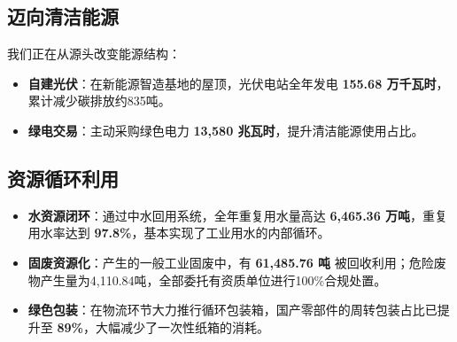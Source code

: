 \documentclass[a4paper,12pt]{article}
\begin{document}
\subsection{迈向清洁能源}
我们正在从源头改变能源结构：
\begin{itemize}
    \item \textbf{自建光伏}：在新能源智造基地的屋顶，光伏电站全年发电 \textbf{155.68 万千瓦时}，累计减少碳排放约835吨。
    \item \textbf{绿电交易}：主动采购绿色电力 \textbf{13,580 兆瓦时}，提升清洁能源使用占比。
\end{itemize}

\subsection{资源循环利用}
\begin{itemize}
    \item \textbf{水资源闭环}：通过中水回用系统，全年重复用水量高达 \textbf{6,465.36 万吨}，重复用水率达到 \textbf{97.8\%}，基本实现了工业用水的内部循环。
    \item \textbf{固废资源化}：产生的一般工业固废中，有 \textbf{61,485.76 吨} 被回收利用；危险废物产生量为4,110.84吨，全部委托有资质单位进行100\%合规处置。
    \item \textbf{绿色包装}：在物流环节大力推行循环包装箱，国产零部件的周转包装占比已提升至 \textbf{89\%}，大幅减少了一次性纸箱的消耗。
\end{itemize}
\end{document}
